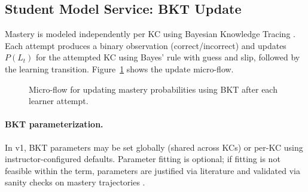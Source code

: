 \documentclass{article}
\begin{document}
\FloatBarrier

\subsection{Student Model Service: BKT Update}
Mastery is modeled independently per KC using Bayesian Knowledge Tracing \cite{corbett1995}. Each attempt produces
a binary observation (correct/incorrect) and updates $P(L_t)$ for the attempted KC using Bayes' rule with guess and
slip, followed by the learning transition. Figure~\ref{fig:bkt-microflow} shows the update micro-flow.

\begin{figure}[H]
\centering
{}
\caption{Micro-flow for updating mastery probabilities using BKT after each learner attempt.}
\label{fig:bkt-microflow}
\end{figure}

\paragraph{BKT parameterization.}
In v1, BKT parameters may be set globally (shared across KCs) or per-KC using instructor-configured defaults.
Parameter fitting is optional; if fitting is not feasible within the term, parameters are justified via literature
and validated via sanity checks on mastery trajectories \cite{corbett1995,vandesande2013}.
\end{document}
